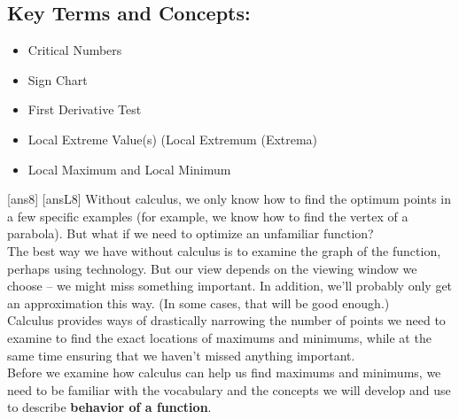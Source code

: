 \begin{framed}
\subsection*{Key Terms and Concepts:} 

\begin{multicols}{2}
\begin{itemize}
    \item Critical Numbers
    \item Sign Chart
    \item First Derivative Test
    \item Local Extreme Value(s) (Local Extremum (Extrema)
    \item Local Maximum and Local Minimum
\end{itemize}
\end{multicols}
\end{framed}

\newpage
[ans8]
[ansL8]
\noindent Without calculus, we only know how to find the optimum points in a few specific examples (for example, we know how to find the vertex of a parabola). But what if we need to optimize an unfamiliar function?\\
The best way we have without calculus is to examine the graph of the function, perhaps using technology. But our view depends on the viewing window we choose – we might miss something important. In addition, we’ll probably only get an approximation this way. (In some cases, that will be good enough.)\\
Calculus provides ways of drastically narrowing the number of points we need to examine to find the exact locations of maximums and minimums, while at the same time ensuring that we haven’t missed anything important.\\
Before we examine how calculus can help us find maximums and minimums, we need to be familiar with the vocabulary and the concepts we will develop and use to describe \textbf{behavior of a function}.\\

